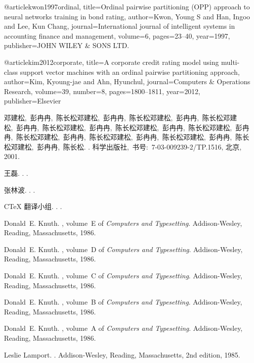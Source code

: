 \begin{thebibliography}{10}

@article{kwon1997ordinal,
  title={Ordinal pairwise partitioning (OPP) approach to neural networks training in bond rating},
  author={Kwon, Young S and Han, Ingoo and Lee, Kun Chang},
  journal={International journal of intelligent systems in accounting finance and management},
  volume={6},
  pages={23--40},
  year={1997},
  publisher={JOHN WILEY \& SONS LTD.}
}

@article{kim2012corporate,
  title={A corporate credit rating model using multi-class support vector machines with an ordinal pairwise partitioning approach},
  author={Kim, Kyoung-jae and Ahn, Hyunchul},
  journal={Computers \& Operations Research},
  volume={39},
  number={8},
  pages={1800--1811},
  year={2012},
  publisher={Elsevier}
}

{邓建松,~彭冉冉,~陈长松邓建松,~彭冉冉,~陈长松邓建松,~彭冉冉,~陈长松邓建松,~彭冉冉,~陈长松邓建松,~彭冉冉,~陈长松邓建松,~彭冉冉,~陈长松邓建松,~彭冉冉,~陈长松邓建松,~彭冉冉,~陈长松邓建松,~彭冉冉,~陈长松邓建松,~彭冉冉,~陈长松邓建松,~彭冉冉,~陈长松}.
.
\newblock 科学出版社,~书号:~7-03-009239-2/TP.1516, 北京, 2001.

王磊.
.
.

张林波.
.
.

C\TeX{} 翻译小组.
.
.

Donald~E. Knuth.
, volume~E of {\em Computers and
  Typesetting}.
\newblock Addison-Wesley, Reading, Massachusetts, 1986.

Donald~E. Knuth.
, volume~D of {\em Computers and
  Typesetting}.
\newblock Addison-Wesley, Reading, Massachusetts, 1986.

Donald~E. Knuth.
, volume~C of {\em Computers and
  Typesetting}.
\newblock Addison-Wesley, Reading, Massachusetts, 1986.

Donald~E. Knuth.
, volume~B of {\em Computers and
  Typesetting}.
\newblock Addison-Wesley, Reading, Massachusetts, 1986.

Donald~E. Knuth.
, volume~A of {\em Computers and Typesetting}.
\newblock Addison-Wesley, Reading, Massachusetts, 1986.

Leslie Lamport.
.
\newblock Addison-Wesley, Reading, Massachusetts, 2nd edition, 1985.

\end{thebibliography}
